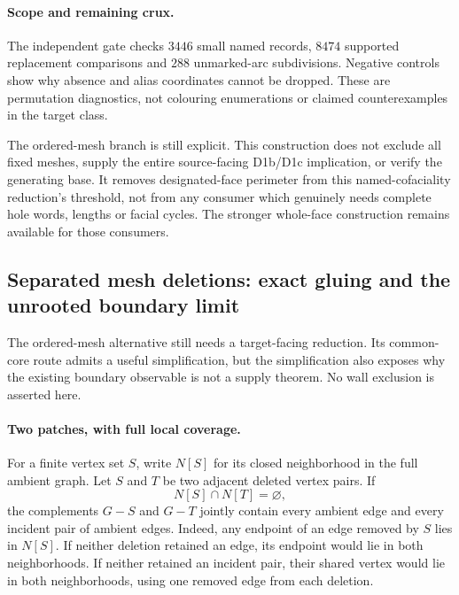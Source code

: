 \paragraph{Scope and remaining crux.}
The independent gate checks $3446$ small named records, $8474$ supported
replacement comparisons and $288$ unmarked-arc subdivisions. Negative
controls show why absence and alias coordinates cannot be dropped. These
are permutation diagnostics, not colouring enumerations or claimed
counterexamples in the target class.

The ordered-mesh branch is still explicit. This construction does not
exclude all fixed meshes, supply the entire source-facing D1b/D1c
implication, or verify the generating base. It removes designated-face
perimeter from this named-cofaciality reduction's threshold, not from any
consumer which genuinely needs complete hole words, lengths or facial
cycles. The stronger whole-face construction remains available for those
consumers.

\subsection{Separated mesh deletions: exact gluing and the unrooted boundary limit}
\label{sec:separated-deletion-boundary}

The ordered-mesh alternative still needs a target-facing reduction. Its
common-core route admits a useful simplification, but the simplification
also exposes why the existing boundary observable is not a supply theorem.
No wall exclusion is asserted here.

\paragraph{Two patches, with full local coverage.}
For a finite vertex set $S$, write $N[S]$ for its closed neighborhood in
the full ambient graph. Let $S$ and $T$ be two adjacent deleted vertex
pairs. If
\[
                         N[S]\cap N[T]=\varnothing,
\]
the complements $G-S$ and $G-T$ jointly contain every ambient edge and
every incident pair of ambient edges. Indeed, any endpoint of an edge
removed by $S$ lies in $N[S]$. If neither deletion retained an edge, its
endpoint would lie in both neighborhoods. If neither retained an incident
pair, their shared vertex would lie in both neighborhoods, using one
removed edge from each deletion.

